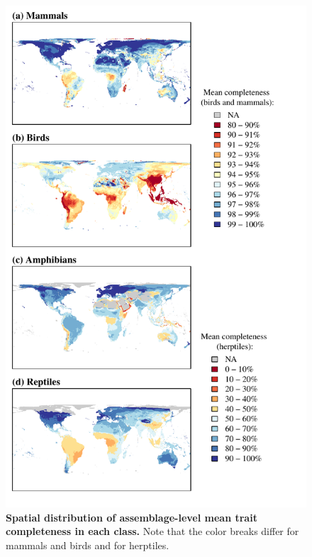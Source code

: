 \newpage
\begin{figure}[h!]
\vspace*{-2cm}
\centering
\includegraphics[scale=0.95]{Supporting/Chapter2/Figures/Maps/Mean_map_50k}
\caption[Spatial distribution of assemblage-level mean trait completeness in each class.]{\textbf{Spatial distribution of assemblage-level mean trait completeness in each class.} Note that the color breaks differ for mammals and birds and for herptiles.}
\label{SI2_meancomp_spatial}
\end{figure}

